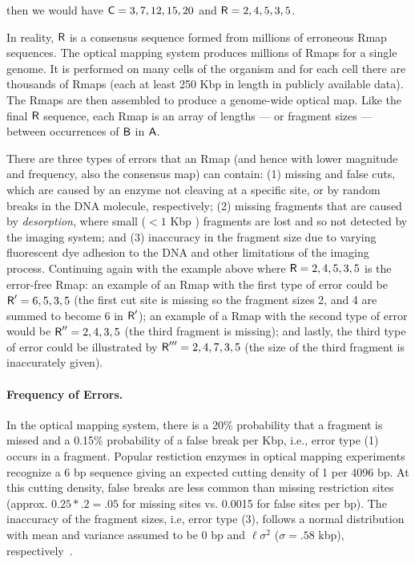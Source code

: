 \noindent then we would have $\mbox{\rm {\sf C}} = 3,7,12,15,20$ and $\mbox{\rm {\sf R}} = 2,4,5,3,5$.  

In reality, $\mbox{\rm {\sf R}}$ is a consensus sequence formed from millions of erroneous Rmap sequences.
The optical mapping system produces millions of Rmaps for a single genome. It is performed on many cells of the organism and for each cell there are thousands of Rmaps (each at least 250 Kbp in length in publicly available data).
The Rmaps are then assembled to produce a genome-wide optical map.
Like the final $\mbox{\rm {\sf R}}$ sequence, each Rmap is an array of lengths --- or fragment sizes --- between occurrences of $\mathsf{B}$ in $\mathsf{A}$.

There are three types of errors that an Rmap (and hence with lower magnitude and frequency, also the consensus map) can contain: (1) missing and false cuts, which are caused by an enzyme not cleaving at a specific site, or by random breaks in the DNA molecule, respectively; (2) missing fragments that are caused by {\em desorption}, where small ($ < 1$ Kbp ) fragments are lost and so not detected by the imaging system; and (3) inaccuracy in the fragment size due to varying fluorescent dye adhesion to the DNA and other limitations of the imaging process.  Continuing again with the example above where $\mbox{\rm {\sf R}} = 2,4,5,3,5$ is the error-free Rmap: an example of an Rmap with the first type of error could be $\mbox{\rm {\sf R}}' = 6,5,3,5$ (the first cut site is missing so the fragment sizes 2, and 4 are summed to become 6 in $\mbox{\rm {\sf R}}'$); an example of a Rmap with the second type of error would be $\mbox{\rm {\sf R}}'' = 2,4,3,5$ (the third fragment is missing); and lastly, the third type of error could be illustrated by $\mbox{\rm {\sf R}}''' = 2,4,7,3,5$ (the size of the third fragment is inaccurately given).  
\paragraph{Frequency of Errors.} In the optical mapping system, there is a 20\% probability that a fragment is missed and a 0.15\% probability of a false break per Kbp, i.e., error type (1) occurs in a fragment.  Popular restiction enzymes in optical mapping experiments recognize a 6 bp sequence giving an expected cutting density of 1 per 4096 bp.  At this cutting density, false breaks are less common than missing restriction sites (approx. $0.25 * .2 = .05$ for missing sites vs. 0.0015 for false sites per bp).  The inaccuracy of the fragment sizes, i.e, error type (3), follows a normal distribution with mean and variance assumed to be 0 bp and $\ell \sigma^2$ ($\sigma = .58$ kbp), respectively~\cite{Valouev06}. %

